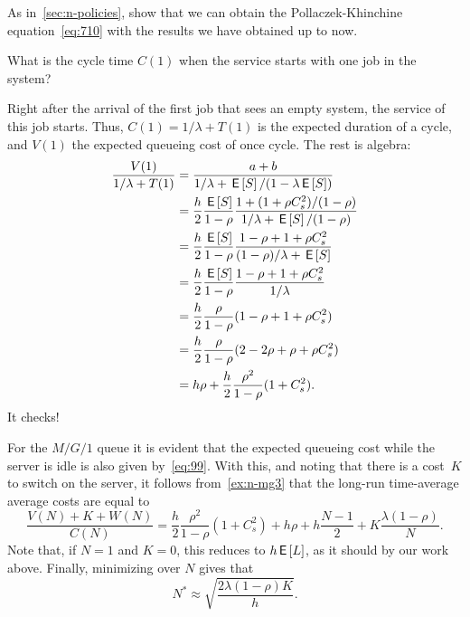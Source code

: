 \documentclass[companion]{subfiles}
\begin{document}
\begin{exercise}
As in~\cref{sec:n-policies}, show that we can obtain the Pollaczek-Khinchine equation~\cref{eq:710} with the results we have obtained up to now. 
\begin{hint}
  What is the cycle time $C(1)$ when the service starts with one job in the system? 
\end{hint}
\begin{solution}
  Right after the arrival of the first job that sees an empty system, the service of this job starts.
  Thus, $C(1) = 1/\lambda + T(1)$ is the expected duration of a cycle, and $V(1)$ the expected queueing cost of once cycle.
  The rest is algebra:
  \begin{align*}
    \frac{V(1)}{1/\lambda + T(1)}
    &= \frac{a + b}{1/\lambda + \,\mathsf{E}\left[S\right]/(1-\lambda \,\mathsf{E}\left[S\right])} \\
    &= \frac{h} 2 \frac{\,\mathsf{E}\left[S\right]}{1-\rho} \frac{1 + (1+\rho C_s^2 )/(1-\rho)}{1/\lambda + \,\mathsf{E}\left[S\right] /(1-\rho)} \\
    &= \frac{h} 2 \frac{\,\mathsf{E}\left[S\right]}{1-\rho} \frac{1-\rho + 1 +\rho C_s^2}{(1-\rho)/\lambda + \,\mathsf{E}\left[S\right]} \\
    &= \frac{h} 2 \frac{\,\mathsf{E}\left[S\right]}{1-\rho} \frac{1-\rho + 1 +\rho C_s^2}{1/\lambda } \\
    &= \frac{h} 2 \frac{\rho}{1-\rho} (1-\rho + 1 +\rho C_s^2) \\
    &= \frac{h} 2 \frac{\rho}{1-\rho} (2-2\rho + \rho +\rho C_s^2) \\
    &= h \rho + \frac h 2 \frac{\rho^2}{1-\rho} (1+ C_s^2).
  \end{align*}
It checks!  
\end{solution}
\end{exercise}

For the $M/G/1$ queue it is evident that the expected queueing cost while the server is idle is also given by~\cref{eq:99}.
With this, and noting that there is a cost~$K$ to switch on the server, it follows from~\cref{ex:n-mg3} that the long-run time-average average costs are equal to
\begin{equation}
  \label{eq:100}
    \frac{V(N) + K + W(N)}{C(N)}
    = \frac h 2 \frac{\rho^2}{1-\rho} (1+ C_s^2) + h \rho + h \frac{N-1}2 + K \frac{\lambda(1-\rho)}N.
\end{equation}
Note that, if $N=1$ and $K=0$, this reduces to $h \,\mathsf{E}\left[L\right]$, as it should by our work above.
Finally, minimizing over $N$ gives that
\begin{equation*}
  N^* \approx \sqrt{\frac{2\lambda(1-\rho)K}{h}}.
\end{equation*}
\end{document}
